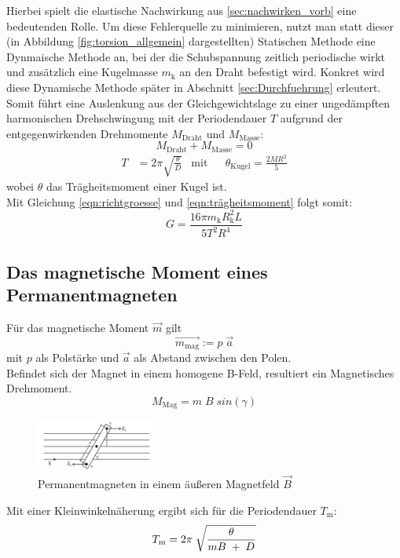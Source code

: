 Hierbei spielt die elastische Nachwirkung aus \ref{sec:nachwirken_vorb} eine bedeutenden Rolle.
Um diese Fehlerquelle zu minimieren, nutzt man statt dieser (in Abbildung \ref{fig:torsion_allgemein} dargestellten) 
Statischen Methode eine Dynmaische
Methode an, bei der die Schubspannung zeitlich periodische wirkt und zusätzlich eine Kugelmasse $m_\text{k}$ 
an den Draht befestigt wird.
Konkret wird diese Dynamische Methode später in Abschnitt \ref{sec:Durchfuehrung} erleutert.\\
\newpage
Somit führt eine Auslenkung aus der Gleichgewichtslage zu einer ungedämpften harmonischen
Drehschwingung mit der Periodendauer $T$ aufgrund der entgegenwirkenden Drehmomente $M_\text{Draht}$ 
und $M_\text{Masse}$:
\begin{equation}
    M_\text{Draht} + M_\text{Masse} = 0
\end{equation}
\begin{align}
    T & = 2\pi \sqrt{\frac{\theta}{D}} & \mathrm{mit} & &  \theta_\text{Kugel} = \frac{2MR^2}{5}
    \label{eqn:trägheitsmoment}
\end{align}
wobei $\theta$ das Trägheitsmoment einer Kugel ist.\\

Mit Gleichung \ref{eqn:richtgroesse} und \ref{eqn:trägheitsmoment} folgt somit:
\begin{equation}
    G=\frac{16 \pi m_\text{k}R^2_\text{k}L}{5T^2R^4}
    \label{eqn:schubmodul_formel}
\end{equation}


\subsection{Das magnetische Moment eines Permanentmagneten}
Für das magnetische Moment $\vec{m}$ gilt
\begin{equation}
    \vec{m_\text{mag}}:=p\;\vec{a}
\end{equation}
mit $p$ als Polstärke und $\vec{a}$ als Abstand zwischen den Polen.\\
Befindet sich der Magnet in einem homogene B-Feld, resultiert ein Magnetisches Drehmoment.
\begin{equation}
    M_\text{Mag} = m\;B\;sin(\gamma)
\end{equation}

\begin{figure}[h]
    \centering
    \includegraphics[width=0.35\textwidth, height=0.15\textwidth]{bilder/Drehmoment.jpg}
    \caption{Permanentmagneten in einem äußeren Magnetfeld $\vec{B}$}        
    \label{fig:drehmoment}
\end{figure}

Mit einer Kleinwinkelnäherung ergibt sich für die Periodendauer $T_\text{m}$:
\begin{equation}
    T_\text{m} = 2\pi\;\sqrt{\frac{\theta}{mB\;+\;D}}\\
    \label{eqn:periode}
\end{equation}

